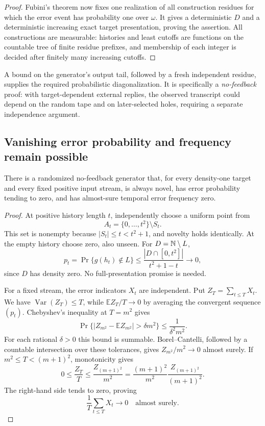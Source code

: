 \begin{proof}
Fubini's theorem now fixes one realization of all construction residues for which the error event has probability one over $\omega$. It gives a deterministic $D$ and a deterministic increasing exact target presentation, proving the assertion. All constructions are measurable: histories and least cutoffs are functions on the countable tree of finite residue prefixes, and membership of each integer is decided after finitely many increasing cutoffs.
\end{proof}

A bound on the generator's output tail, followed by a fresh independent residue, supplies the required probabilistic diagonalization. It is specifically a \emph{no-feedback} proof: with target-dependent external replies, the observed transcript could depend on the random tape and on later-selected holes, requiring a separate independence argument.

\subsection{Vanishing error probability and frequency remain possible}

\begin{theorem}\label{sh:vanishing-error}
There is a randomized no-feedback generator that, for every density-one target and every fixed positive input stream, is always novel, has error probability tending to zero, and has almost-sure temporal error frequency zero.
\end{theorem}
\begin{proof}
At positive history length $t$, independently choose a uniform point from
\[
A_t=\{0,\ldots,t^2\}\setminus S_t.
\]
This set is nonempty because $|S_t|\le t<t^2+1$, and novelty holds identically. At the empty history choose zero, also unseen. For $D=\mathbb N\setminus L$,
\[
p_t=\Pr\{g(h_t)\notin L\}
\le\frac{|D\cap[0,t^2]|}{t^2+1-t}\longrightarrow0,
\]
since $D$ has density zero. No full-presentation promise is needed.

For a fixed stream, the error indicators $X_t$ are independent. Put $Z_T=\sum_{t\le T}X_t$. We have $\operatorname{Var}(Z_T)\le T$, while $\mathbb E Z_T/T\to0$ by averaging the convergent sequence $(p_t)$. Chebyshev's inequality at $T=m^2$ gives
\[
 \Pr\{|Z_{m^2}-\mathbb E Z_{m^2}|>\delta m^2\}
 \le\frac1{\delta^2m^2}.
\]
For each rational $\delta>0$ this bound is summable. Borel--Cantelli, followed by a countable intersection over these tolerances, gives $Z_{m^2}/m^2\to0$ almost surely. If $m^2\le T<(m+1)^2$, monotonicity gives
\[
 0\le\frac{Z_T}{T}\le\frac{Z_{(m+1)^2}}{m^2}
 =\frac{(m+1)^2}{m^2}\frac{Z_{(m+1)^2}}{(m+1)^2}.
\]
The right-hand side tends to zero, proving
\[
\frac1T\sum_{t\le T}X_t\longrightarrow0\quad\text{almost surely}.
\]
\end{proof}

